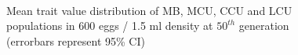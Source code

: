 \begin{figure}[p]
{  }\\
  \caption{Mean trait value distribution of MB, MCU, CCU and LCU populations in 600 eggs / 1.5 ml density at $50^{th}$ generation (errorbars represent 95\% CI)}
  \label{fig:lh_mcu_culture}
\end{figure}
